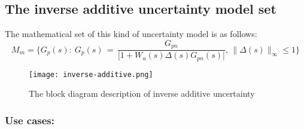 \subsection{The inverse additive uncertainty model set}
The mathematical set of this kind of uncertainty model is as follows:
\[
M_m = \{G_p(s):\:G_p(s)\,=\,\frac{G_{pn}}{[1 + W_u(s)\Delta(s)G_{pn}(s)|},\,\|\Delta(s)\|_\infty\leq 1 \}
\]
\begin{figure}[H]
    \centering
    \texttt{[image: inverse-additive.png]}
    \caption{The block diagram description of inverse additive uncertainty}
\end{figure}

\subsubsection{Use cases:}
